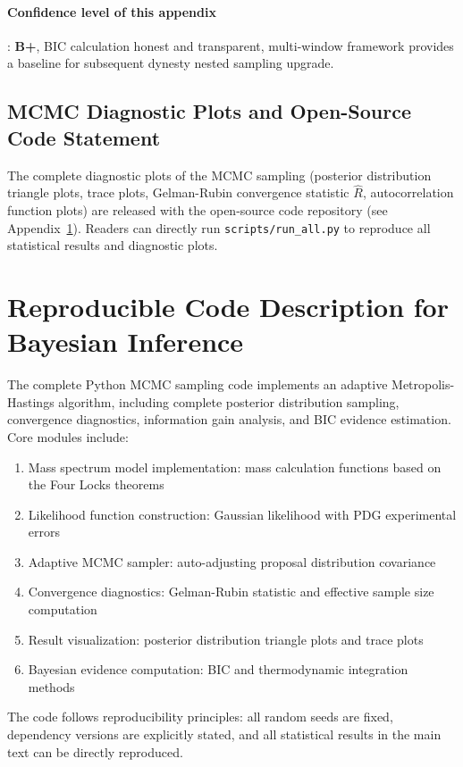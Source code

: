 \documentclass[12pt,a4paper,twocolumn]{article}
\begin{document}
\paragraph{Confidence level of this appendix}: \textbf{B+}, BIC calculation honest and transparent, multi-window framework provides a baseline for subsequent dynesty nested sampling upgrade.

\subsection{MCMC Diagnostic Plots and Open-Source Code Statement}
The complete diagnostic plots of the MCMC sampling (posterior distribution triangle plots, trace plots, Gelman-Rubin convergence statistic $\hat{R}$, autocorrelation function plots) are released with the open-source code repository (see Appendix~\ref{app:code}). Readers can directly run \texttt{scripts/run\_all.py} to reproduce all statistical results and diagnostic plots.

\section{Reproducible Code Description for Bayesian Inference}
\label{app:code}

The complete Python MCMC sampling code implements an adaptive Metropolis-Hastings algorithm, including complete posterior distribution sampling, convergence diagnostics, information gain analysis, and BIC evidence estimation. Core modules include:
\begin{enumerate}
\item Mass spectrum model implementation: mass calculation functions based on the Four Locks theorems
\item Likelihood function construction: Gaussian likelihood with PDG experimental errors
\item Adaptive MCMC sampler: auto-adjusting proposal distribution covariance
\item Convergence diagnostics: Gelman-Rubin statistic and effective sample size computation
\item Result visualization: posterior distribution triangle plots and trace plots
\item Bayesian evidence computation: BIC and thermodynamic integration methods
\end{enumerate}

The code follows reproducibility principles: all random seeds are fixed, dependency versions are explicitly stated, and all statistical results in the main text can be directly reproduced.
\end{document}
